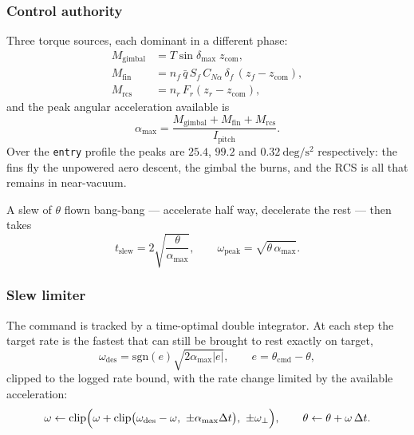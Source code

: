 \documentclass[11pt,a4paper]{article}
\newcommand{\code}[1]{\texttt{#1}}
\begin{document}
\subsubsection{Control authority}

Three torque sources, each dominant in a different phase:
\begin{align}
M_{\mathrm{gimbal}} &= T \sin\delta_{\max}\; z_{\mathrm{com}}, \\
M_{\mathrm{fin}} &= n_f\, \bar q\, S_f\, C_{N\alpha}\, \delta_f\,
  \left(z_f - z_{\mathrm{com}}\right), \\
M_{\mathrm{rcs}} &= n_r\, F_r \left(z_r - z_{\mathrm{com}}\right),
\end{align}
and the peak angular acceleration available is
\begin{equation}
\alpha_{\max} = \frac{M_{\mathrm{gimbal}}+M_{\mathrm{fin}}+M_{\mathrm{rcs}}}{I_{\mathrm{pitch}}} .
\label{eq:alphamax}
\end{equation}
Over the \code{entry} profile the peaks are $25.4$, $99.2$ and
$0.32\ \mathrm{deg/s^2}$ respectively: the fins fly the unpowered aero descent,
the gimbal the burns, and the RCS is all that remains in near-vacuum.

A slew of $\theta$ flown bang-bang --- accelerate half way, decelerate the rest
--- then takes
\begin{equation}
t_{\mathrm{slew}} = 2\sqrt{\frac{\theta}{\alpha_{\max}}},
\qquad
\omega_{\mathrm{peak}} = \sqrt{\theta\,\alpha_{\max}} .
\label{eq:slewtime}
\end{equation}

\subsubsection{Slew limiter}

The command is tracked by a time-optimal double integrator. At each step the
target rate is the fastest that can still be brought to rest exactly on target,
\begin{equation}
\omega_{\mathrm{des}} = \mathrm{sgn}(e)\sqrt{2\alpha_{\max}\lvert e\rvert},
\qquad e = \theta_{\mathrm{cmd}} - \theta,
\end{equation}
clipped to the logged rate bound, with the rate change limited by the available
acceleration:
\begin{equation}
\omega \leftarrow \mathrm{clip}\Bigl(
  \omega + \mathrm{clip}\bigl(\omega_{\mathrm{des}}-\omega,\ \pm\alpha_{\max}\Delta t\bigr),
  \ \pm\omega_\perp\Bigr),
\qquad
\theta \leftarrow \theta + \omega\,\Delta t .
\end{equation}
\end{document}
